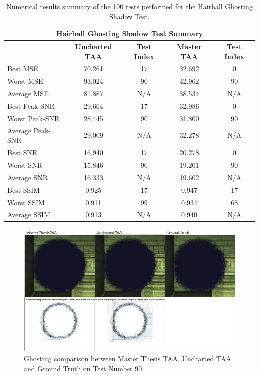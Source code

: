 \documentclass{cslthse-msc}
\begin{document}
\begin{table}[H]
	\small
	\centering
	\caption{Numerical results summary of the 100 tests performed for the Hairball Ghosting Shadow Test.}
	\begin{tabular}{|l|c|c|c|c|}
		\hline
		\multicolumn{5}{|c|}{\textbf{Hairball Ghosting Shadow Test Summary}} \\
		\hline
		\multicolumn{1}{|c|}{\textbf{\diagbox{Tests}{AA}}} & \textbf{Uncharted TAA} & \textbf{Test Index} & \textbf{Master TAA} & \textbf{Test Index} \\
		\hline
	    Best MSE & 70.261 & 17    & 32.692 & 0 \\
		\hline
		Worst MSE & 93.024 & 90    & 42.962 & 90 \\
		\hline
		Average MSE & 81.887 & N/A   & 38.534 & N/A \\
		\hline
		Best Peak-SNR & 29.664 & 17    & 32.986 & 0 \\
		\hline
		Worst Peak-SNR & 28.445 & 90    & 31.800 & 90 \\
		\hline
		Average Peak-SNR  & 29.009 & N/A   & 32.278 & N/A \\
		\hline
		Best SNR & 16.940 & 17    & 20.278 & 0 \\
		\hline
		Worst SNR & 15.846 & 90    & 19.201 & 90 \\
		\hline
		Average SNR  & 16.333 & N/A   & 19.602 & N/A \\
		\hline
		Best SSIM & 0.925 & 17    & 0.947 & 17 \\
		\hline
		Worst SSIM & 0.911 & 99    & 0.934 & 68 \\
		\hline
		Average SSIM & 0.913 & N/A   & 0.940 & N/A \\
		\hline
	\end{tabular}%
	\label{tab:hairball_ghosting_shadow}%
\end{table}%

\begin{figure}[H]
	\centering
	\includegraphics[scale=0.8]{images/results/hairball_ghosting_shadow.png}
	\caption{Ghosting comparison between Master Thesis TAA, Uncharted TAA and Ground Truth on Test Number 90.}\label{fig:hairball_ghosting_shadow}
\end{figure}
\end{document}
